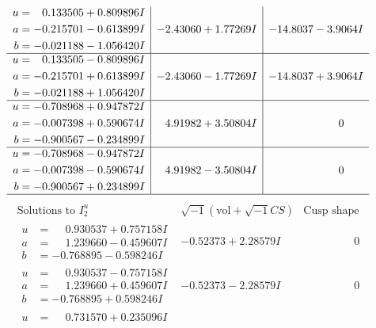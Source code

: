 \documentclass[1p]{elsarticle_modified}
\theoremstyle{definition}
\newcommand{\I}{\sqrt{-1}}
\begin{document}
$$\begin{array}{c|c|c}
\begin{aligned}
u &= \phantom{-}0.133505 + 0.809896 I \\
a &= -0.215701 - 0.613899 I \\
b &= -0.021188 - 1.056420 I\end{aligned}
 & -2.43060 + 1.77269 I & -14.8037 - 3.9064 I \\ \hline\begin{aligned}
u &= \phantom{-}0.133505 - 0.809896 I \\
a &= -0.215701 + 0.613899 I \\
b &= -0.021188 + 1.056420 I\end{aligned}
 & -2.43060 - 1.77269 I & -14.8037 + 3.9064 I \\ \hline\begin{aligned}
u &= -0.708968 + 0.947872 I \\
a &= -0.007398 + 0.590674 I \\
b &= -0.900567 - 0.234899 I\end{aligned}
 & \phantom{-}4.91982 + 3.50804 I & \phantom{-0.000000 } 0 \\ \hline\begin{aligned}
u &= -0.708968 - 0.947872 I \\
a &= -0.007398 - 0.590674 I \\
b &= -0.900567 + 0.234899 I\end{aligned}
 & \phantom{-}4.91982 - 3.50804 I & \phantom{-0.000000 } 0\\
 \hline 
 \end{array}$$\newpage$$\begin{array}{c|c|c}  
\text{Solutions to }I^u_{2}& \I (\text{vol} + \sqrt{-1}CS) & \text{Cusp shape}\\
 \hline 
\begin{aligned}
u &= \phantom{-}0.930537 + 0.757158 I \\
a &= \phantom{-}1.239660 - 0.459607 I \\
b &= -0.768895 - 0.598246 I\end{aligned}
 & -0.52373 + 2.28579 I & \phantom{-0.000000 } 0 \\ \hline\begin{aligned}
u &= \phantom{-}0.930537 - 0.757158 I \\
a &= \phantom{-}1.239660 + 0.459607 I \\
b &= -0.768895 + 0.598246 I\end{aligned}
 & -0.52373 - 2.28579 I & \phantom{-0.000000 } 0 \\ \hline\begin{aligned}
u &= \phantom{-}0.731570 + 0.235096 I \\

\end{aligned}
\end{array}$$
\end{document}
